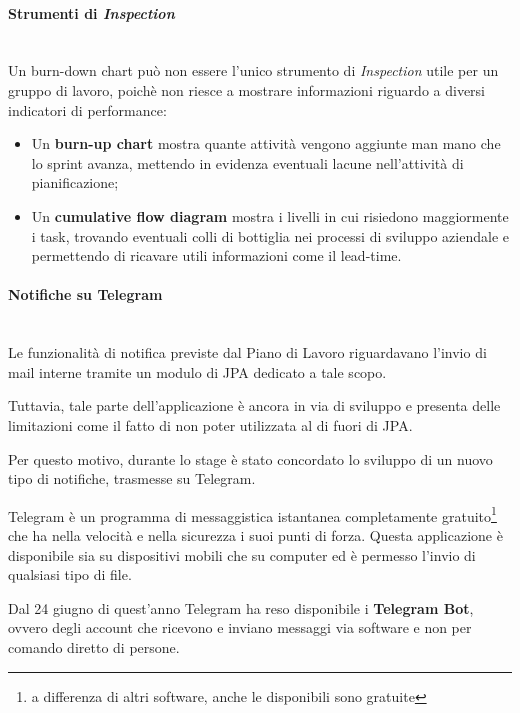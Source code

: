\paragraph{Strumenti di \emph{Inspection}} \mbox{} \\

Un burn-down chart può non essere l'unico strumento di \emph{Inspection} utile
per un gruppo di lavoro, poichè non riesce a mostrare informazioni riguardo a
diversi indicatori di performance:

\begin{itemize}
\item Un \textbf{burn-up chart} mostra quante attività vengono aggiunte man
  mano che lo sprint avanza, mettendo in evidenza eventuali lacune
  nell'attività di pianificazione;
\item Un \textbf{cumulative flow diagram} mostra i livelli in cui risiedono
  maggiormente i task, trovando eventuali colli di bottiglia nei processi di
  sviluppo aziendale e permettendo di ricavare utili informazioni come il
  \gls{lead-time}.
\end{itemize}

\paragraph{Notifiche su Telegram} \mbox{} \\

Le funzionalità di notifica previste dal Piano di Lavoro riguardavano l'invio
di mail interne tramite un modulo di JPA dedicato a tale scopo.

Tuttavia, tale parte dell'applicazione è ancora in via di sviluppo e presenta
delle limitazioni come il fatto di non poter utilizzata al di fuori di JPA.

Per questo motivo, durante lo stage è stato concordato lo sviluppo di un nuovo
tipo di notifiche, trasmesse su Telegram.

Telegram è un programma di messaggistica istantanea completamente
gratuito\footnote{a differenza di altri software, anche le 
disponibili sono gratuite} che ha nella velocità e nella sicurezza i suoi
punti di forza. Questa applicazione è disponibile sia su dispositivi mobili
che su computer ed è permesso l'invio di qualsiasi tipo di file.

Dal 24 giugno di quest'anno Telegram ha reso disponibile i \textbf{Telegram
Bot}, ovvero degli account che ricevono e inviano messaggi via software e non
per comando diretto di persone.

